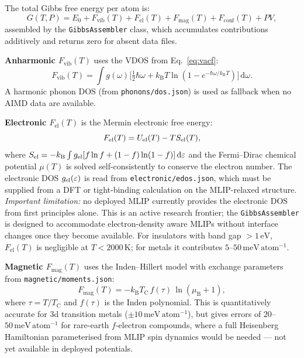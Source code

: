 \documentclass[twocolumn,10pt]{article}
\newcommand{\kB}{k_{\mathrm{B}}}
\newcommand{\Fvib}{F_{\mathrm{vib}}}
\newcommand{\Fel}{F_{\mathrm{el}}}
\newcommand{\Fmag}{F_{\mathrm{mag}}}
\newcommand{\Fconf}{F_{\mathrm{conf}}}
\newcommand{\Ezero}{E_0}
\newcommand{\TC}{T_{\mathrm{C}}}
\newcommand{\muB}{\mu_{\mathrm{B}}}
\newcommand{\vdos}{g(\omega)}
\newcommand{\meVat}{\,\mathrm{meV\,atom^{-1}}}
\begin{document}
The total Gibbs free energy per atom is:
\begin{equation}
  G(T,P) = \Ezero + \Fvib(T) + \Fel(T) + \Fmag(T) + \Fconf(T) + PV,
  \label{eq:gibbs}
\end{equation}
assembled by the \texttt{GibbsAssembler} class, which accumulates contributions
additively and returns zero for absent data files.

\textbf{Anharmonic $\Fvib(T)$} uses the VDOS from Eq.~\eqref{eq:vacf}:
\begin{equation}
  \Fvib(T) = \int \vdos \bigl[{\tfrac{1}{2}}\hbar\omega
    + \kB T \ln(1 - e^{-\hbar\omega/\kB T})\bigr]\,\mathrm{d}\omega.
  \label{eq:fvib}
\end{equation}
A harmonic phonon DOS (from \texttt{phonons/dos.json}) is used as fallback when
no AIMD data are available.

\textbf{Electronic $\Fel(T)$} is the Mermin electronic free energy:
\begin{equation}
  \Fel(T) = U_{\rm el}(T) - T S_{\rm el}(T), \label{eq:fel}
\end{equation}
where $S_{\rm el} = {-\kB}\int g_{\rm el}[f\ln f+(1-f)\ln(1-f)]\,\mathrm{d}\varepsilon$
and the Fermi--Dirac chemical potential $\mu(T)$ is solved self-consistently to
conserve the electron number.
The electronic DOS $g_{\rm el}(\varepsilon)$ is read from
\texttt{electronic/edos.json}, which must be supplied from a DFT or tight-binding
calculation on the MLIP-relaxed structure.
\emph{Important limitation:} no deployed MLIP currently provides the electronic
DOS from first principles alone. This is an active research frontier; the
\texttt{GibbsAssembler} is designed to accommodate electron-density aware
MLIPs\cite{batatia2022mace} without interface changes once they become available.
For insulators with band gap $>1\,\mathrm{eV}$, $\Fel(T)$ is negligible
at $T < 2000\,\mathrm{K}$; for metals it contributes $5$--$50\meVat$.

\textbf{Magnetic $\Fmag(T)$} uses the Inden--Hillert
model\cite{inden1976role,dinsdale1991sgte} with exchange parameters from
\texttt{magnetic/moments.json}:
\begin{equation}
  \Fmag(T) = -\kB\TC\,f(\tau)\,\ln(\muB+1), \label{eq:fmag}
\end{equation}
where $\tau=T/\TC$ and $f(\tau)$ is the Inden polynomial.
This is quantitatively accurate for 3d transition metals ($\pm 10\meVat$),
but gives errors of $20$--$50\meVat$ for rare-earth $f$-electron
compounds\cite{barreda2022anharmonic}, where a full Heisenberg Hamiltonian
parameterised from MLIP spin dynamics would be needed --- not yet available in
deployed potentials.
\end{document}
